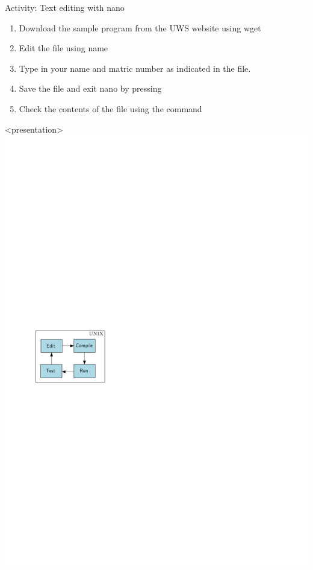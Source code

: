 \begin{frame}[fragile]{Activity: Text editing with nano}
\begin{enumerate}
\item Download the sample  program from the UWS website using wget
\item Edit the file using name 
\item Type in your name and matric number as indicated in the file.  
\item Save the file and exit nano by pressing 
\item Check the contents of the file using the  command
\end{enumerate}
\end{frame}

\begin{frame}<presentation>
\includegraphics[page=3,width=\textwidth]{flow}
\end{frame}


